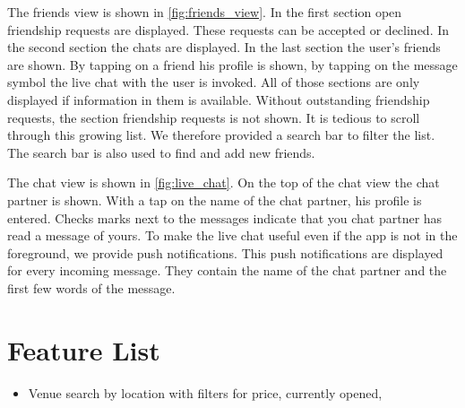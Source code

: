 \documentclass[11pt, accentcolor=tud1c]{tudreport}
\begin{document}
The friends view is shown in \autoref{fig:friends_view}. In the first section open friendship requests are displayed. These requests can be accepted or declined. In the second section the chats are displayed. In the last section the user's friends are shown. By tapping on a friend his profile is shown, by tapping on the message symbol the live chat with the user is invoked. 
All of those sections are only displayed if information in them is available. Without outstanding friendship requests, the section friendship requests is not shown. 
It is tedious to scroll through this growing list. We therefore provided a search bar to filter the list. The search bar is also used to find and add new friends. 

The chat view is shown in \autoref{fig:live_chat}. On the top of the chat view the chat partner is shown.
With a tap on the name of the chat partner, his profile is entered. Checks marks next to the messages indicate that you chat partner has read a message of yours. To make the live chat useful even if the app is not in the foreground, we provide push notifications. This push notifications are displayed for every incoming message. They contain the name of the chat partner and the first few words of the message.


\chapter{Feature List}\label{ch:feature_list}
\begin{itemize}
\item Venue search by location with filters for price, currently opened, 

\end{itemize}
\end{document}
